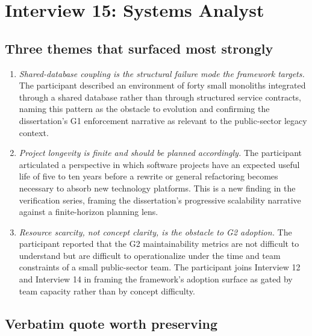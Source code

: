 
\section{Interview 15: Systems Analyst}
\label{sec:interview15}

\subsection*{Three themes that surfaced most strongly}

\begin{enumerate}[itemsep=8pt,topsep=2pt]
  \item \emph{Shared-database coupling is the structural failure mode the framework targets.} The participant described an environment of forty small monoliths integrated through a shared database rather than through structured service contracts, naming this pattern as the obstacle to evolution and confirming the dissertation's G1 enforcement narrative as relevant to the public-sector legacy context.

  \item \emph{Project longevity is finite and should be planned accordingly.} The participant articulated a perspective in which software projects have an expected useful life of five to ten years before a rewrite or general refactoring becomes necessary to absorb new technology platforms. This is a new finding in the verification series, framing the dissertation's progressive scalability narrative against a finite-horizon planning lens.

  \item \emph{Resource scarcity, not concept clarity, is the obstacle to G2 adoption.} The participant reported that the G2 maintainability metrics are not difficult to understand but are difficult to operationalize under the time and team constraints of a small public-sector team. The participant joins Interview 12 and Interview 14 in framing the framework's adoption surface as gated by team capacity rather than by concept difficulty.
\end{enumerate}

\subsection*{Verbatim quote worth preserving}


